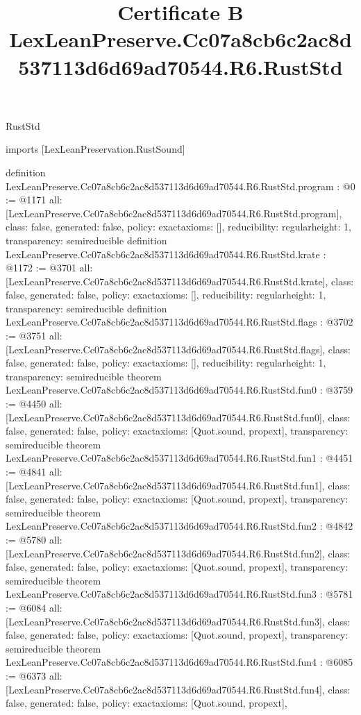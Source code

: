 \begin{lexlean}{RustStd}
\title{Certificate B LexLeanPreserve.Cc07a8cb6c2ac8d537113d6d69ad70544.R6.RustStd}
\begin{coremodule}
imports [LexLeanPreservation.RustSound]

definition LexLeanPreserve.Cc07a8cb6c2ac8d537113d6d69ad70544.R6.RustStd.program : @0 := @1171 {
  all: [LexLeanPreserve.Cc07a8cb6c2ac8d537113d6d69ad70544.R6.RustStd.program],
  class: false,
  generated: false,
  policy: exact{axioms: []},
  reducibility: regular{height: 1},
  transparency: semireducible
}
definition LexLeanPreserve.Cc07a8cb6c2ac8d537113d6d69ad70544.R6.RustStd.krate : @1172 := @3701 {
  all: [LexLeanPreserve.Cc07a8cb6c2ac8d537113d6d69ad70544.R6.RustStd.krate],
  class: false,
  generated: false,
  policy: exact{axioms: []},
  reducibility: regular{height: 1},
  transparency: semireducible
}
definition LexLeanPreserve.Cc07a8cb6c2ac8d537113d6d69ad70544.R6.RustStd.flags : @3702 := @3751 {
  all: [LexLeanPreserve.Cc07a8cb6c2ac8d537113d6d69ad70544.R6.RustStd.flags],
  class: false,
  generated: false,
  policy: exact{axioms: []},
  reducibility: regular{height: 1},
  transparency: semireducible
}
theorem LexLeanPreserve.Cc07a8cb6c2ac8d537113d6d69ad70544.R6.RustStd.fun0 : @3759 := @4450 {
  all: [LexLeanPreserve.Cc07a8cb6c2ac8d537113d6d69ad70544.R6.RustStd.fun0],
  class: false,
  generated: false,
  policy: exact{axioms: [Quot.sound, propext]},
  transparency: semireducible
}
theorem LexLeanPreserve.Cc07a8cb6c2ac8d537113d6d69ad70544.R6.RustStd.fun1 : @4451 := @4841 {
  all: [LexLeanPreserve.Cc07a8cb6c2ac8d537113d6d69ad70544.R6.RustStd.fun1],
  class: false,
  generated: false,
  policy: exact{axioms: [Quot.sound, propext]},
  transparency: semireducible
}
theorem LexLeanPreserve.Cc07a8cb6c2ac8d537113d6d69ad70544.R6.RustStd.fun2 : @4842 := @5780 {
  all: [LexLeanPreserve.Cc07a8cb6c2ac8d537113d6d69ad70544.R6.RustStd.fun2],
  class: false,
  generated: false,
  policy: exact{axioms: [Quot.sound, propext]},
  transparency: semireducible
}
theorem LexLeanPreserve.Cc07a8cb6c2ac8d537113d6d69ad70544.R6.RustStd.fun3 : @5781 := @6084 {
  all: [LexLeanPreserve.Cc07a8cb6c2ac8d537113d6d69ad70544.R6.RustStd.fun3],
  class: false,
  generated: false,
  policy: exact{axioms: [Quot.sound, propext]},
  transparency: semireducible
}
theorem LexLeanPreserve.Cc07a8cb6c2ac8d537113d6d69ad70544.R6.RustStd.fun4 : @6085 := @6373 {
  all: [LexLeanPreserve.Cc07a8cb6c2ac8d537113d6d69ad70544.R6.RustStd.fun4],
  class: false,
  generated: false,
  policy: exact{axioms: [Quot.sound, propext]},
}
\end{coremodule}
\end{lexlean}
